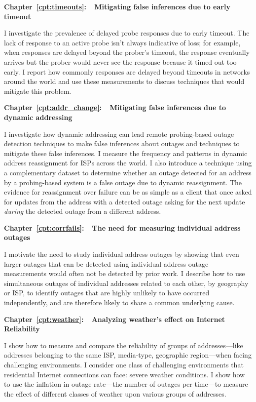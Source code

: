 \textbf{Chapter~\ref{cpt:timeouts}:~~Mitigating false inferences due
to early timeout} 

I investigate the
prevalence of delayed probe responses due to early timeout. The lack
of response to an active probe isn't always indicative of loss; for
example, when responses are delayed beyond the prober's timeout, the
response eventually arrives but the prober would never see the
response because it timed out too early. I report how commonly
responses are delayed beyond timeouts in networks around the world and
use these measurements to discuss techniques that would mitigate this problem.

\textbf{Chapter~\ref{cpt:addr_change}:~~Mitigating false inferences due to dynamic addressing} 

I investigate how dynamic addressing can lead remote probing-based
outage detection techniques to make false inferences about outages and
techniques to mitigate these false inferences. I measure the frequency
and patterns in dynamic address reassignment for ISPs across the
world.  I also introduce a technique using a complementary dataset to
determine whether an outage detected for an address by a probing-based
system is a false outage due to dynamic reassignment. The evidence for
reassignment over failure can be as simple as a client that once asked
for updates from the address with a detected outage asking for the
next update \emph{during} the detected outage from a different address.

\textbf{Chapter~\ref{cpt:corrfails}:~~The need for measuring individual address outages} 

I motivate the need to study individual address outages by showing
that even larger outages that can be detected using individual address
outage measurements would often not be
detected by prior work. I describe how to use simultaneous outages of
individual addresses related
to each other, by geography or ISP, to identify outages that are
highly unlikely to have occurred independently, and are therefore
likely to share a common underlying cause. 

\textbf{Chapter~\ref{cpt:weather}:~~Analyzing weather's effect on
  Internet Reliability} 

I show how to measure and compare the reliability of groups of addresses---like
addresses belonging to the same ISP, media-type, geographic
region---when facing challenging environments. I consider one class of
challenging environments that residential Internet connections can
face: severe weather conditions. I show how to use the inflation in
outage rate---the number of outages per time---to measure the effect
of different classes of weather upon various groups of addresses.

